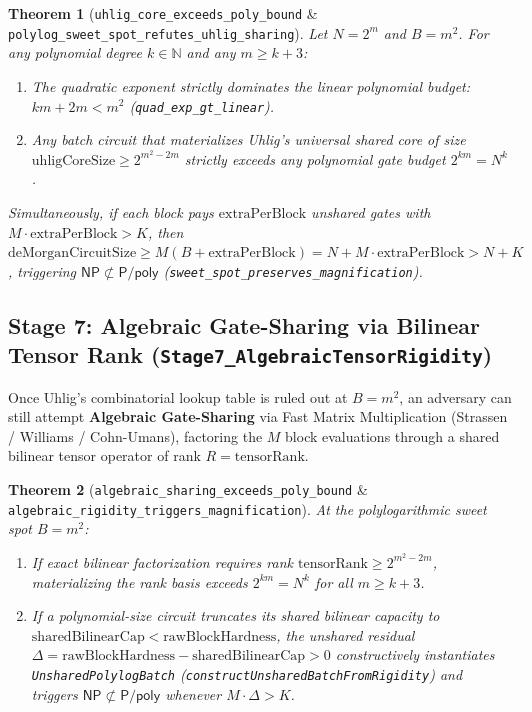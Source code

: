 \documentclass[11pt,a4paper]{article}
\theoremstyle{plain}
\newtheorem{theorem}{Theorem}[section]
\theoremstyle{definition}
\theoremstyle{remark}
\newcommand{\lean}[1]{\texttt{\textcolor{slate}{#1}}}
\newcommand{\NP}{\mathsf{NP}}
\newcommand{\Ppoly}{\mathsf{P/poly}}
\newcommand{\N}{\mathbb{N}}
\begin{document}
\begin{theorem}[\lean{uhlig\_core\_exceeds\_poly\_bound} \& \lean{polylog\_sweet\_spot\_refutes\_uhlig\_sharing}]
Let $N = 2^m$ and $B = m^2$. For any polynomial degree $k \in \N$ and any $m \ge k + 3$:
\begin{enumerate}[noitemsep]
    \item The quadratic exponent strictly dominates the linear polynomial budget: $k m + 2 m < m^2$ (\lean{quad\_exp\_gt\_linear}).
    \item Any batch circuit that materializes Uhlig's universal shared core of size $\mathrm{uhligCoreSize} \ge 2^{m^2 - 2m}$ strictly exceeds any polynomial gate budget $2^{km} = N^k$.
\end{enumerate}
Simultaneously, if each block pays $\mathrm{extraPerBlock}$ unshared gates with $M \cdot \mathrm{extraPerBlock} > K$, then $\mathrm{deMorganCircuitSize} \ge M(B + \mathrm{extraPerBlock}) = N + M \cdot \mathrm{extraPerBlock} > N + K$, triggering $\NP \not\subset \Ppoly$ (\lean{sweet\_spot\_preserves\_magnification}).
\end{theorem}

\subsection{Stage 7: Algebraic Gate-Sharing via Bilinear Tensor Rank (\lean{Stage7\_AlgebraicTensorRigidity})}
Once Uhlig's combinatorial lookup table is ruled out at $B = m^2$, an adversary can still attempt \textbf{Algebraic Gate-Sharing} via Fast Matrix Multiplication (Strassen / Williams / Cohn-Umans), factoring the $M$ block evaluations through a shared bilinear tensor operator of rank $R = \mathrm{tensorRank}$.

\begin{theorem}[\lean{algebraic\_sharing\_exceeds\_poly\_bound} \& \lean{algebraic\_rigidity\_triggers\_magnification}]
At the polylogarithmic sweet spot $B = m^2$:
\begin{enumerate}[noitemsep]
    \item If exact bilinear factorization requires rank $\mathrm{tensorRank} \ge 2^{m^2 - 2m}$, materializing the rank basis exceeds $2^{km} = N^k$ for all $m \ge k + 3$.
    \item If a polynomial-size circuit truncates its shared bilinear capacity to $\mathrm{sharedBilinearCap} < \mathrm{rawBlockHardness}$, the unshared residual $\Delta = \mathrm{rawBlockHardness} - \mathrm{sharedBilinearCap} > 0$ constructively instantiates \lean{UnsharedPolylogBatch} (\lean{constructUnsharedBatchFromRigidity}) and triggers $\NP \not\subset \Ppoly$ whenever $M \cdot \Delta > K$.
\end{enumerate}
\end{theorem}
\end{document}
